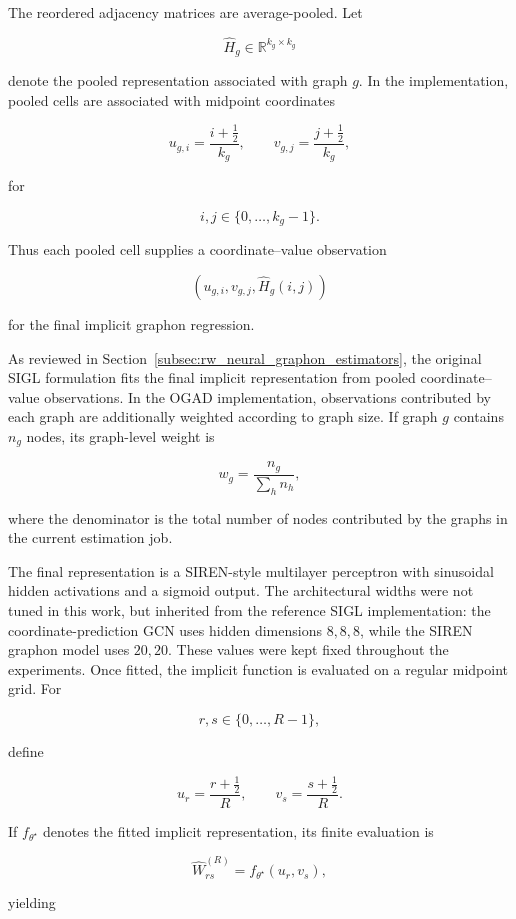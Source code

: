 The reordered adjacency matrices are average-pooled. Let

\[
\widehat{H}_g
\in
\mathbb{R}^{k_g\times k_g}
\]

denote the pooled representation associated with graph \(g\). In the implementation, pooled cells are associated with midpoint coordinates

\[
u_{g,i}
=
\frac{i+\tfrac{1}{2}}{k_g},
\qquad
v_{g,j}
=
\frac{j+\tfrac{1}{2}}{k_g},
\]

for

\[
i,j\in\{0,\ldots,k_g-1\}.
\]

Thus each pooled cell supplies a coordinate--value observation

\[
\left(
u_{g,i},
v_{g,j},
\widehat{H}_g(i,j)
\right)
\]

for the final implicit graphon regression.

As reviewed in Section~\ref{subsec:rw_neural_graphon_estimators}, the original SIGL formulation fits the final implicit representation from pooled coordinate--value observations. In the OGAD implementation, observations contributed by each graph are additionally weighted according to graph size. If graph \(g\) contains \(n_g\) nodes, its graph-level weight is

\[
w_g
=
\frac{n_g}
{\sum_h n_h},
\]

where the denominator is the total number of nodes contributed by the graphs in the current estimation job.

The final representation is a SIREN-style multilayer perceptron with sinusoidal hidden activations \cite{sitzmann2020implicit} and a sigmoid output. The architectural widths were not tuned in this work, but inherited from the reference SIGL implementation: the coordinate-prediction GCN uses hidden dimensions \(8,8,8\), while the SIREN graphon model uses \(20,20\). These values were kept fixed throughout the experiments.
Once fitted, the implicit function is evaluated on a regular midpoint grid. For

\[
r,s\in\{0,\ldots,R-1\},
\]

define

\[
u_r
=
\frac{r+\tfrac{1}{2}}{R},
\qquad
v_s
=
\frac{s+\tfrac{1}{2}}{R}.
\]

If \(f_{\theta^\star}\) denotes the fitted implicit representation, its finite evaluation is

\[
\widehat{W}^{(R)}_{rs}
=
f_{\theta^\star}(u_r,v_s),
\]

yielding

